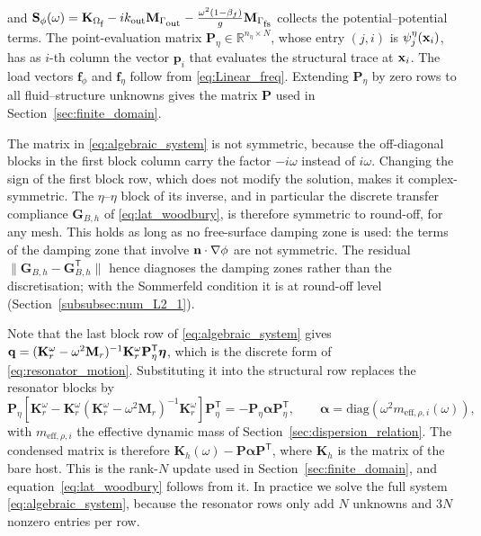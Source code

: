 and $\mathbf{S}_\phi(\omega)=\mathbf{K}_{\Omega_{\mbox{\scriptsize f}}}-ik_{\mathrm{out}}\mathbf{M}_{\Gamma_{\mbox{\scriptsize out}}}-\frac{\omega^2(1-\beta_f)}{g}\mathbf{M}_{\Gamma_{\mbox{\scriptsize fs}}}$ collects the potential--potential terms. The point-evaluation matrix $\mathbf{P}_\eta\in\mathbb{R}^{n_\eta\times N}$, whose entry $(j,i)$ is $\psi^\eta_j(\mathbf{x}_i)$, has as $i$-th column the vector $\mathbf{p}_i$ that evaluates the structural trace at $\mathbf{x}_i$. The load vectors $\mathbf{f}_\phi$ and $\mathbf{f}_\eta$ follow from \eqref{eq:Linear_freq}.  Extending $\mathbf{P}_\eta$ by zero rows to all fluid--structure unknowns gives the matrix $\mathbf{P}$ used in Section~\ref{sec:finite_domain}.

\begin{remark}\label{rem:discrete_reciprocity}
The matrix in \eqref{eq:algebraic_system} is not symmetric, because the off-diagonal blocks in the first block column carry the factor $-i\omega$ instead of $i\omega$. Changing the sign of the first block row, which does not modify the solution, makes it complex-symmetric. The $\eta$--$\eta$ block of its inverse, and in particular the discrete transfer compliance $\mathbf{G}_{B,h}$ of \eqref{eq:lat_woodbury}, is therefore symmetric to round-off, for any mesh. This holds as long as no free-surface damping zone is used: the terms of the damping zone that involve $\mathbf{n}\cdot\nabla\phi$ are not symmetric. The residual $\|\mathbf{G}_{B,h}-\mathbf{G}_{B,h}^{\mathsf T}\|$ hence diagnoses the damping zones rather than the discretisation; with the Sommerfeld condition it is at round-off level (Section~\ref{subsubsec:num_L2_1}).
\end{remark}

Note that the last block row of \eqref{eq:algebraic_system} gives $\mathbf{q}=(\mathbf{K}_r^\omega-\omega^2\mathbf{M}_r)^{-1}\mathbf{K}_r^\omega\mathbf{P}_\eta^{\mathsf T}\boldsymbol{\eta}$, which is the discrete form of \eqref{eq:resonator_motion}. Substituting it into the structural row replaces the resonator blocks by
\begin{equation}\label{eq:resonator_condensation}
    \mathbf{P}_\eta\left[\mathbf{K}_r^\omega-\mathbf{K}_r^\omega(\mathbf{K}_r^\omega-\omega^2\mathbf{M}_r)^{-1}\mathbf{K}_r^\omega\right]\mathbf{P}_\eta^{\mathsf T}
    =-\mathbf{P}_\eta\boldsymbol{\alpha}\mathbf{P}_\eta^{\mathsf T},
    \qquad
    \boldsymbol{\alpha}=\mathrm{diag}\left(\omega^2m_{\mathrm{eff},\rho,i}(\omega)\right),
\end{equation}
with $m_{\mathrm{eff},\rho,i}$ the effective dynamic mass of Section~\ref{sec:dispersion_relation}. The condensed matrix is therefore $\mathbf{K}_h(\omega)-\mathbf{P}\boldsymbol{\alpha}\mathbf{P}^{\mathsf T}$, where $\mathbf{K}_h$ is the matrix of the bare host. This is the rank-$N$ update used in Section~\ref{sec:finite_domain}, and equation~\eqref{eq:lat_woodbury} follows from it. In practice we solve the full system \eqref{eq:algebraic_system}, because the resonator rows only add $N$ unknowns and $3N$ nonzero entries per row.

